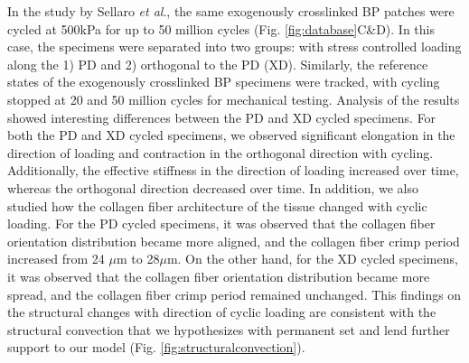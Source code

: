 	In the study by Sellaro \textit{et al}.\cite{sellaro_effects_2007}, the same exogenously crosslinked BP patches were cycled at 500kPa for up to 50 million cycles (Fig. \ref{fig:database}C\&D). In this case, the specimens were separated into two groups: with stress controlled loading along the 1) PD and 2) orthogonal to the PD (XD). Similarly, the reference states of the exogenously crosslinked BP specimens were tracked, with cycling stopped at 20 and 50 million cycles for mechanical testing. Analysis of the results showed interesting differences between the PD and XD cycled specimens. For both the PD and XD cycled specimens, we observed significant elongation in the direction of loading and contraction in the orthogonal direction with cycling. Additionally, the effective stiffness in the direction of loading increased over time, whereas the orthogonal direction decreased over time. In addition, we also studied how the collagen fiber architecture of the tissue changed with cyclic loading. For the PD cycled specimens, it was observed that the collagen fiber orientation distribution became more aligned, and the collagen fiber crimp period increased from 24 $\mu$m to 28$\mu$m. On the other hand, for the XD cycled specimens, it was observed that the collagen fiber orientation distribution became more spread, and the collagen fiber crimp period remained unchanged. This findings on the structural changes with direction of cyclic loading are consistent with the structural convection that we hypothesizes with permanent set and lend further support to our model (Fig. \ref{fig:structuralconvection}). 